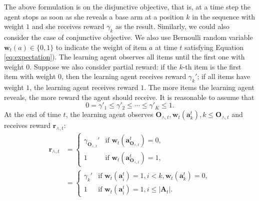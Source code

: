 \documentclass{article}
\newcommand{\bA}{\mathbf{A}}
\newcommand{\ba}{\mathbf{a}}
\newcommand{\bO}{\mathbf{O}}
\newcommand{\br}{\mathbf{r}}
\newcommand{\bw}{\mathbf{w}}
\newcommand{\abs}[1]{\left| #1 \right|}
\begin{document}
The above formulation is on the disjunctive objective, that is, at a time step the agent stops as soon as she reveals a base arm at a position $k$ in the sequence with weight $1$ and she receives reward $\gamma_k$ as the result. 
Similarly, we could also consider the case of conjunctive objective. 
We also use Bernoulli random variable $\bw_{t}(a) \in \{0,1\}$ to indicate the weight of item $a$ at time $t$ satisfying Equation \eqref{eq:expectation}). 
The learning agent observes all items until the first one with weight $0$. 
Suppose we also consider partial reward: if the $k$-th item is the first item with weight $0$, then the learning agent receives reward $\gamma_k'$; if all items have weight $1$, the learning agent receives reward $1$. 
The more items the learning agent reveals, the more reward the agent should receive. It is reasonable to assume that
$$
  0 = \gamma'_1 \leq \gamma'_2 \leq \cdots \leq \gamma'_K \leq 1.
$$
At the end of time $t$, the learning agent observes $\bO_{\wedge, t}, \bw_t(\ba_k^t), k \leq \bO_{\wedge, t}$ and receives reward $\br_{\wedge, t}$:
\begin{align*}
  \br_{\wedge, t} &= \begin{cases}
    \gamma_{\bO_{\wedge, t}}'  &\text{if } \bw_t(\ba_{\bO_{\wedge, t}}^t) = 0,\\
    1 &\text{if } \bw_t(\ba_{\bO_{\wedge, t}}^t) = 1,
  \end{cases}\\
  &=\begin{cases}
    \gamma_{k}'  &\text{if } \bw_t(\ba_{i}^t) = 1, i < k, \bw_t(\ba_{k}^t) = 0,\\
    1 &\text{if } \bw_t(\ba_{i}^t) = 1, i\leq \abs{\bA_t}.
  \end{cases}
\end{align*}
\end{document}
